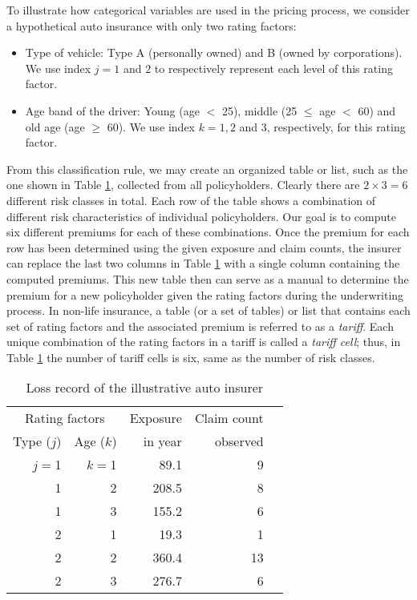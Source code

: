 \documentclass[12pt]{article}
\begin{document}
To illustrate how categorical variables are used in the pricing process, we consider a hypothetical auto insurance with only two rating factors:
\begin{itemize}
  \item Type of vehicle: Type A (personally owned) and B (owned by corporations). We use index $j=1$ and $2$ to respectively represent each level of this rating factor.
  \item Age band of the driver:  Young (age $<$ 25), middle (25 $\le$ age $<$ 60) and old age (age $\ge$ 60). We use index $k=1, 2$ and $3$, respectively, for this rating factor.
\end{itemize}
From this classification rule, we may create an organized  table or list, such as the one shown in Table \ref{tab.tariff.1}, collected from all policyholders. Clearly there are $2 \times 3=6$ different risk classes in total. Each row of the table shows a combination of different risk characteristics of individual policyholders. Our goal is to compute six different premiums for each of these combinations. Once the premium for each row has been determined using the given exposure and claim counts, the insurer can replace the last two columns in Table \ref{tab.tariff.1} with a single column containing the computed premiums. This new table then can serve as a manual to determine the premium for a new policyholder given the rating factors during the underwriting process. In non-life insurance, a table (or a set of tables) or list that contains each set of rating factors and the associated premium is referred to as a \textit{tariff}. Each unique combination of the rating factors in a tariff is called a \textit{tariff cell}; thus, in Table \ref{tab.tariff.1} the number of tariff cells is six,  same as the number of risk classes.\\

\begin{table}[htp]
\caption{Loss record of the illustrative auto insurer}
\begin{center}
\begin{tabular}{rrrrc}
 \hline
 \multicolumn{2}{c}{Rating factors } &   Exposure & Claim count \\
 \cline{1-2} 
Type ($j$) & Age ($k$) &  in year & observed\\
\hline \hline
$j=$1 & $k=$1 &  89.1 & 9\\
1 & 2   & 208.5& 8\\
1 & 3  & 155.2 & 6  \\
2  & 1  & 19.3 & 1 \\
2  & 2  & 360.4 & 13 \\
2   & 3  & 276.7 & 6 \\ \hline
\end{tabular}
\end{center}
\label{tab.tariff.1}
\end{table}%
\end{document}
